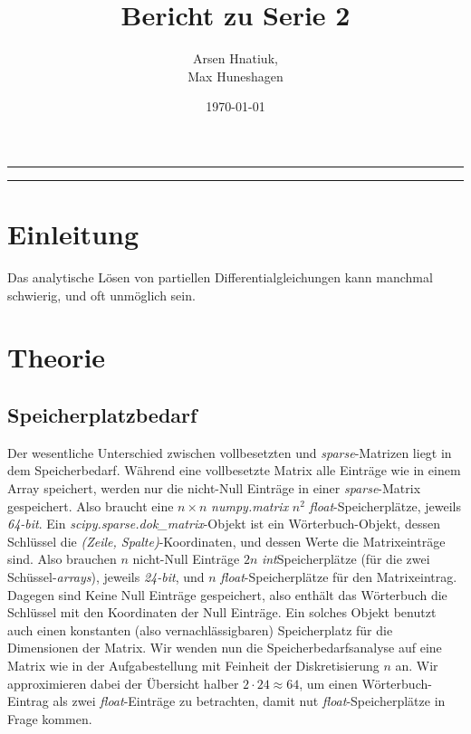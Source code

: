 \documentclass[smallheadings]{scrartcl}
\title{Bericht zu Serie 2}
\author{%
  Arsen Hnatiuk,\\%
  Max Huneshagen 
}
\date{\today}
\begin{document}
\maketitle
\tableofcontents
\bigskip

\hrule
\hrule


\section{Einleitung}

Das analytische Lösen von partiellen Differentialgleichungen kann manchmal schwierig, und oft unmöglich sein.

\section{Theorie}

\subsection{Speicherplatzbedarf}
\label{sec:bedarf}
Der wesentliche Unterschied zwischen vollbesetzten und \textit{sparse}-Matrizen  liegt in dem Speicherbedarf. Während eine vollbesetzte Matrix alle Einträge wie in einem Array speichert, werden nur die nicht-Null Einträge in einer \textit{sparse}-Matrix gespeichert. Also braucht eine $n \times n$ \textit{numpy.matrix} $n^2$ \textit{float}-Speicherplätze, jeweils \textit{64-bit}. Ein \textit{scipy.sparse.dok\_matrix}-Objekt  ist ein Wörterbuch-Objekt, dessen Schlüssel die \textit{(Zeile, Spalte)}-Koordinaten, und dessen Werte die Matrixeinträge sind. Also brauchen $n$ nicht-Null Einträge $2n$ \textit{int}Speicherplätze (für die zwei Schüssel-\textit{arrays}), jeweils \textit{24-bit}, und $n$ \textit{float}-Speicherplätze für den Matrixeintrag. Dagegen sind Keine Null Einträge gespeichert, also enthält das Wörterbuch die Schlüssel mit den Koordinaten der Null Einträge. Ein solches Objekt benutzt auch einen konstanten (also vernachlässigbaren) Speicherplatz für die Dimensionen der Matrix. Wir wenden nun die Speicherbedarfsanalyse auf eine Matrix wie in der Aufgabestellung mit Feinheit der Diskretisierung $n$ an. Wir approximieren dabei der Übersicht halber $2 \cdot 24 \approx 64$, um einen Wörterbuch-Eintrag als zwei \textit{float}-Einträge zu betrachten, damit nut \textit{float}-Speicherplätze in Frage kommen.
\end{document}
